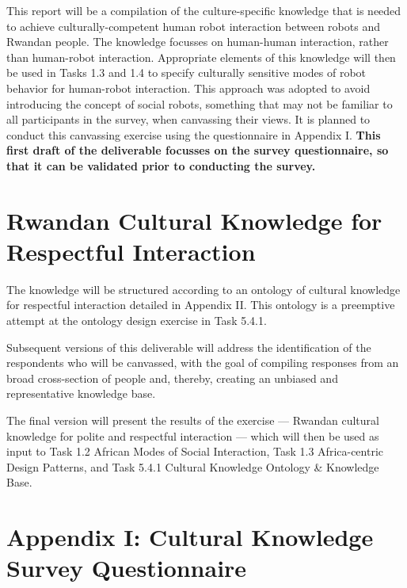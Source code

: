 \documentclass{CSSRforAfrica}
\begin{document}
This report will be a compilation of the culture-specific knowledge that is needed to achieve culturally-competent human robot interaction between robots and Rwandan people.   The knowledge focusses on human-human interaction, rather than human-robot interaction. Appropriate elements of this knowledge will then be used in Tasks 1.3 and 1.4 to specify culturally sensitive modes of robot behavior for human-robot interaction. This approach was adopted to avoid introducing the concept of social robots, something that may not be familiar to all participants in the survey,  when canvassing their views.   It is planned to conduct this canvassing exercise using the questionnaire in Appendix I. {\bf  This first draft of the deliverable focusses on the survey questionnaire, so that it can be validated prior to conducting the survey.}
 
\section{Rwandan Cultural Knowledge for Respectful Interaction}
 
The knowledge will be structured according to an ontology of cultural knowledge for respectful interaction detailed in Appendix II.  This ontology is a preemptive attempt at the ontology design exercise in Task 5.4.1.

Subsequent versions of this deliverable will address the identification of the respondents who will be canvassed, with the goal of compiling responses from an broad cross-section of people and, thereby, creating an unbiased and representative knowledge base.

The final version will present the results of the exercise --- Rwandan cultural knowledge for polite and respectful interaction --- which will then be used as input to Task 1.2 African Modes of Social Interaction, Task 1.3 Africa-centric Design Patterns,  and Task 5.4.1 Cultural Knowledge Ontology \& Knowledge Base.



\newpage

\section*{Appendix I: Cultural Knowledge  Survey  Questionnaire }
 
\end{document}
